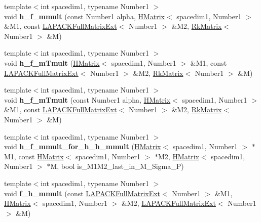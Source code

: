 \begin{DoxyCompactItemize}
\item 
\mbox{\label{classRkMatrix_ad090448398bf367cba0b208456144e7d}} 
{\footnotesize template$<$int spacedim1, typename Number1 $>$ }\\void {\bfseries h\+\_\+f\+\_\+mmult} (const Number1 alpha, \hyperlink{classHMatrix}{H\+Matrix}$<$ spacedim1, Number1 $>$ \&M1, const \hyperlink{classLAPACKFullMatrixExt}{L\+A\+P\+A\+C\+K\+Full\+Matrix\+Ext}$<$ Number1 $>$ \&M2, \hyperlink{classRkMatrix}{Rk\+Matrix}$<$ Number1 $>$ \&M)
\item 
\mbox{\label{classRkMatrix_a8f368b3c372ece4b6506d89bb9e255df}} 
{\footnotesize template$<$int spacedim1, typename Number1 $>$ }\\void {\bfseries h\+\_\+f\+\_\+m\+Tmult} (\hyperlink{classHMatrix}{H\+Matrix}$<$ spacedim1, Number1 $>$ \&M1, const \hyperlink{classLAPACKFullMatrixExt}{L\+A\+P\+A\+C\+K\+Full\+Matrix\+Ext}$<$ Number1 $>$ \&M2, \hyperlink{classRkMatrix}{Rk\+Matrix}$<$ Number1 $>$ \&M)
\item 
\mbox{\label{classRkMatrix_ad81f9d9c00ebd7bdabb28b6ea0646236}} 
{\footnotesize template$<$int spacedim1, typename Number1 $>$ }\\void {\bfseries h\+\_\+f\+\_\+m\+Tmult} (const Number1 alpha, \hyperlink{classHMatrix}{H\+Matrix}$<$ spacedim1, Number1 $>$ \&M1, const \hyperlink{classLAPACKFullMatrixExt}{L\+A\+P\+A\+C\+K\+Full\+Matrix\+Ext}$<$ Number1 $>$ \&M2, \hyperlink{classRkMatrix}{Rk\+Matrix}$<$ Number1 $>$ \&M)
\item 
\mbox{\label{classRkMatrix_a897365f6716975f71b528f610498c69b}} 
{\footnotesize template$<$int spacedim1, typename Number1 $>$ }\\void {\bfseries h\+\_\+f\+\_\+mmult\+\_\+for\+\_\+h\+\_\+h\+\_\+mmult} (\hyperlink{classHMatrix}{H\+Matrix}$<$ spacedim1, Number1 $>$ $\ast$M1, const \hyperlink{classHMatrix}{H\+Matrix}$<$ spacedim1, Number1 $>$ $\ast$M2, \hyperlink{classHMatrix}{H\+Matrix}$<$ spacedim1, Number1 $>$ $\ast$M, bool is\+\_\+\+M1\+M2\+\_\+last\+\_\+in\+\_\+\+M\+\_\+\+Sigma\+\_\+P)
\item 
\mbox{\label{classRkMatrix_a67b0f45b3a6734fef74d90f28fcefbc1}} 
{\footnotesize template$<$int spacedim1, typename Number1 $>$ }\\void {\bfseries f\+\_\+h\+\_\+mmult} (const \hyperlink{classLAPACKFullMatrixExt}{L\+A\+P\+A\+C\+K\+Full\+Matrix\+Ext}$<$ Number1 $>$ \&M1, \hyperlink{classHMatrix}{H\+Matrix}$<$ spacedim1, Number1 $>$ \&M2, \hyperlink{classLAPACKFullMatrixExt}{L\+A\+P\+A\+C\+K\+Full\+Matrix\+Ext}$<$ Number1 $>$ \&M)

\end{DoxyCompactItemize}
